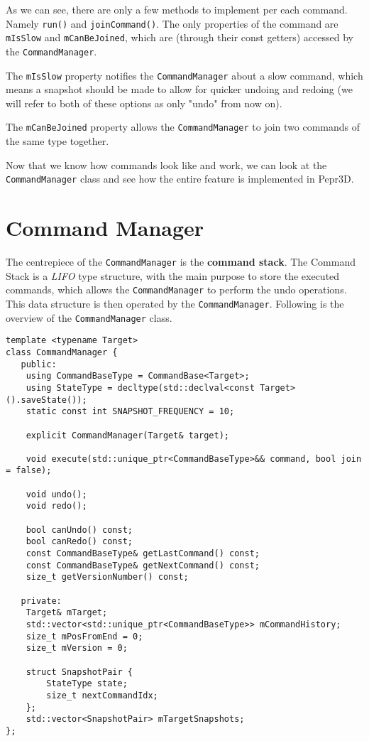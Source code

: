 As we can see, there are only a few methods to implement per each command. Namely \texttt{run()} and \texttt{joinCommand()}. The only properties of the command are \texttt{mIsSlow} and \texttt{mCanBeJoined}, which are (through their const getters) accessed by the \texttt{CommandManager}.

The \texttt{mIsSlow} property notifies the \texttt{CommandManager} about a slow command, which means a snapshot should be made to allow for quicker undoing and redoing (we will refer to both of these options as only "undo" from now on).

The \texttt{mCanBeJoined} property allows the \texttt{CommandManager} to join two commands of the same type together.

Now that we know how commands look like and work, we can look at the \texttt{CommandManager} class and see how the entire feature is implemented in Pepr3D.

\section{Command Manager}

The centrepiece of the \texttt{CommandManager} is the \textbf{command stack}. The Command Stack is a \textit{LIFO} type structure, with the main purpose to store the executed commands, which allows the \texttt{CommandManager} to perform the undo operations. This data structure is then operated by the \texttt{CommandManager}. Following is the overview of the \texttt{CommandManager} class.

\begin{lstlisting}
template <typename Target>
class CommandManager {
   public:
    using CommandBaseType = CommandBase<Target>;
    using StateType = decltype(std::declval<const Target>().saveState());
    static const int SNAPSHOT_FREQUENCY = 10;

    explicit CommandManager(Target& target);

    void execute(std::unique_ptr<CommandBaseType>&& command, bool join = false);

    void undo();
    void redo();

    bool canUndo() const;
    bool canRedo() const;
    const CommandBaseType& getLastCommand() const;
    const CommandBaseType& getNextCommand() const;
    size_t getVersionNumber() const;

   private:
    Target& mTarget;
    std::vector<std::unique_ptr<CommandBaseType>> mCommandHistory;
    size_t mPosFromEnd = 0;
    size_t mVersion = 0;

    struct SnapshotPair {
        StateType state;
        size_t nextCommandIdx;
    };
    std::vector<SnapshotPair> mTargetSnapshots;
};
\end{lstlisting}

